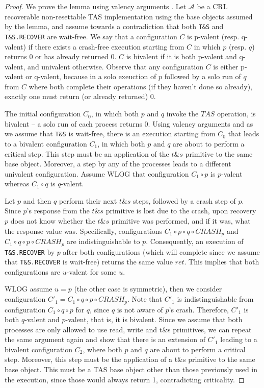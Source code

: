 \begin{proof}
	We prove the lemma using valency arguments \cite{DBLP:journals/jacm/FischerLP85}. Let $\mathcal{A}$ be a CRL recoverable non-resettable TAS implementation using the base objects assumed by the lemma, and assume towards a contradiction that both \texttt{T\&S} and \texttt{T\&S.RECOVER} are wait-free. We say that a configuration $C$ is p-valent (resp. q-valent) if there exists a crash-free execution starting from $C$ in which $p$ (resp. $q$) returns 0 or has already returned $0$. $C$ is bivalent if it is both p-valent and q-valent, and univalent otherwise. Observe that any configuration $C$ is either p-valent or q-valent, because in a solo exeuction of $p$ followed by a solo run of $q$ from $C$ where both complete their operations (if they haven't done so already), exactly one must return (or already returned) 0.
	
	The initial configuration $C_0$, in which both $p$ and $q$ invoke the $TAS$ operation, is bivalent -- a solo run of each process returns 0. Using valency arguments and as we assume that \texttt{T\&S} is wait-free, there is an execution starting from $C_0$ that leads to a bivalent configuration $C_1$, in which both $p$ and $q$ are about to perform a critical step. This step must be an application of the $t\&s$ primitive to the same base object. Moreover, a step by any of the processes leads to a different univalent configuration. Assume WLOG that configuration $C_1 \circ p$ is $p$-valent whereas $C_1 \circ q$ is $q$-valent.
	
	Let $p$ and then $q$ perform their next $t\&s$ steps, followed by a crash step of $p$. Since $p$'s response from the $t\&s$ primitive is lost due to the crash, upon recovery $p$ does not know whether the $t\&s$ primitive was performed, and if it was, what the response value was. Specifically, configurations $C_1 \circ p \circ q \circ CRASH_p$ and $C_1 \circ q \circ p \circ CRASH_p$ are indistinguishable to $p$. Consequently, an execution of \texttt{T\&S.RECOVER} by $p$ after both configurations (which will complete since we assume that \texttt{T\&S.RECOVER} is wait-free) returns the same value $ret$. This implies that both configurations are $u$-valent for some $u$.
	
	WLOG assume $u=p$ (the other case is symmetric), then we consider configuration $C'_1=C_1 \circ q \circ p \circ CRASH_p$. Note that $C'_1$ is indistinguishable from configuration $C_1 \circ q \circ p$ for $q$, since $q$ is not aware of $p$'s crash. Therefore, $C'_1$ is both $q$-valent and $p$-valent, that is, it is bivalent. Since we assume that both processes are only allowed to use read, write and t\&s primitives, we can repeat the same argument again and show that there is an extension of $C'_1$ leading to a bivalent configuration $C_2$, where both $p$ and $q$ are about to perform a critical step. Moreover, this step must be the application of a t\&s primitive to the same base object. This must be a TAS base object other than those previously used in the execution, since those would always return 1, contradicting criticality.
	

\end{proof}
